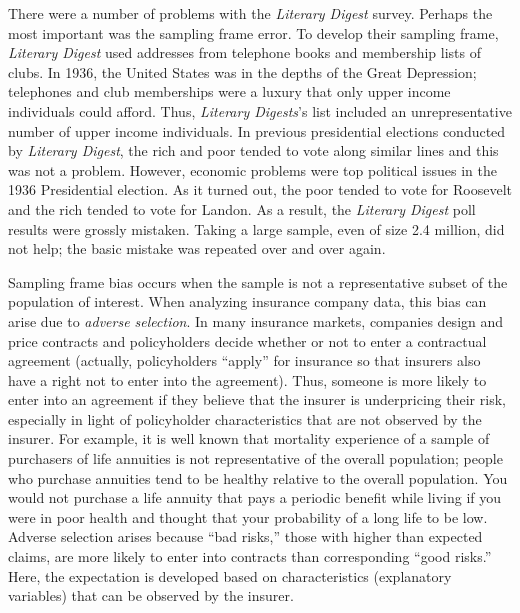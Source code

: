 There were a number of problems with the \textit{Literary Digest}
survey. Perhaps the most important was the sampling frame error. To
develop their sampling frame, \textit{Literary Digest} used
addresses from telephone books and membership lists of clubs. In
1936, the United States was in the depths of the Great Depression;
telephones and club memberships were a luxury that only upper income
individuals could afford. Thus, \textit{Literary Digests}'s list
included an unrepresentative number of upper income individuals. In
previous presidential elections conducted by \textit{Literary
Digest}, the rich and poor tended to vote along similar lines and
this was not a problem. However, economic problems were top
political issues in the 1936 Presidential election. As it turned
out, the poor tended to vote for Roosevelt and the rich tended to
vote for Landon. As a result, the \textit{Literary Digest} poll
results were grossly mistaken. Taking a large sample, even of size
2.4 million, did not help; the basic mistake was repeated over and
over again.

\linejed

\bigskip{}

Sampling frame bias occurs when the sample is not a representative
subset of the population of interest. When analyzing insurance
company data, this bias can arise due to \emph{adverse selection}.
In many insurance markets, companies design and price contracts and
policyholders decide whether or not to enter a contractual agreement
(actually, policyholders ``apply'' for insurance so that insurers
also have a right not to enter into the agreement). Thus, someone is
more likely to enter into an agreement if they believe that the
insurer is underpricing their risk, especially in light of
policyholder characteristics that are not observed by the insurer.
For example, it is well known that mortality experience of a sample
of purchasers of life annuities is not representative of the overall
population; people who purchase annuities tend to be healthy
relative to the overall population. You would not purchase a life
annuity that pays a periodic benefit while living if you were in
poor health and thought that your probability of a long life to be
low. Adverse selection arises because ``bad risks,'' those with
higher than expected claims, are more likely to enter into contracts
than corresponding ``good risks.'' Here, the expectation is
developed based on characteristics (explanatory variables) that can
be observed by the insurer.

